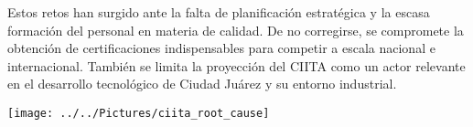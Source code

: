 Estos retos han surgido ante la falta de planificación estratégica y la escasa formación del personal en materia de calidad. De no corregirse, se compromete la obtención de certificaciones indispensables para competir a escala nacional e internacional. También se limita la proyección del CIITA como un actor relevante en el desarrollo tecnológico de Ciudad Juárez y su entorno industrial.

\begin{center}
	\texttt{[image: ../../Pictures/ciita\_root\_cause]}
\end{center}